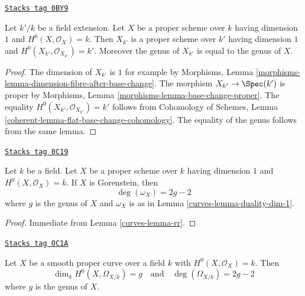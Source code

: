 \begin{lemma}
\label{curves-lemma-genus-base-change}
\href{https://stacks.math.columbia.edu/tag/0BY9}{\texttt{Stacks tag 0BY9}}

Let $k'/k$ be a field extension. Let $X$ be a proper scheme over $k$ having
dimension $1$ and $H^0(X, \mathcal{O}_X) = k$. Then $X_{k'}$ is a
proper scheme over $k'$
having dimension $1$ and $H^0(X_{k'}, \mathcal{O}_{X_{k'}}) = k'$.
Moreover the genus of $X_{k'}$ is equal to the genus of $X$.
\end{lemma}

\begin{proof}
The dimension of $X_{k'}$ is $1$ for example by
Morphisms, Lemma \ref{morphisms-lemma-dimension-fibre-after-base-change}.
The morphism $X_{k'} \to \Spec(k')$ is proper by
Morphisms, Lemma \ref{morphisms-lemma-base-change-proper}.
The equality $H^0(X_{k'}, \mathcal{O}_{X_{k'}}) = k'$ follows from
Cohomology of Schemes, Lemma
\ref{coherent-lemma-flat-base-change-cohomology}.
The equality of the genus follows from the same lemma.
\end{proof}

\begin{lemma}
\label{curves-lemma-genus-gorenstein}
\href{https://stacks.math.columbia.edu/tag/0C19}{\texttt{Stacks tag 0C19}}

Let $k$ be a field. Let $X$ be a proper scheme over $k$ having
dimension $1$ and $H^0(X, \mathcal{O}_X) = k$. If $X$ is Gorenstein,
then
$$
\deg(\omega_X) = 2g - 2
$$
where $g$ is the genus of $X$ and $\omega_X$ is as in
Lemma \ref{curves-lemma-duality-dim-1}.
\end{lemma}

\begin{proof}

Immediate from Lemma \ref{curves-lemma-rr}.
\end{proof}

\begin{lemma}
\label{curves-lemma-genus-smooth}
\href{https://stacks.math.columbia.edu/tag/0C1A}{\texttt{Stacks tag 0C1A}}

Let $X$ be a smooth proper curve over a field $k$
with $H^0(X, \mathcal{O}_X) = k$. Then
$$
\dim_k H^0(X, \Omega_{X/k}) = g
\quad\text{and}\quad
\deg(\Omega_{X/k}) = 2g - 2
$$
where $g$ is the genus of $X$.
\end{lemma}

